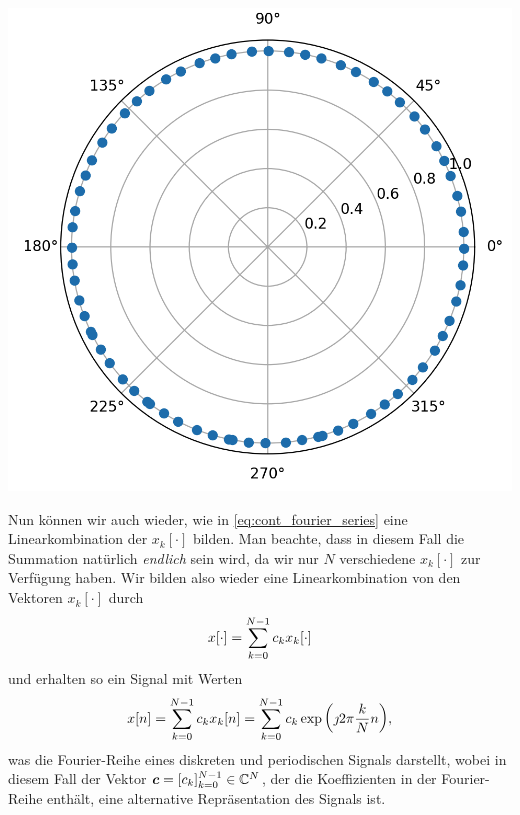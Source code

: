 \begin{listing}
\begin{minipage}{0.3\textwidth}
        \includegraphics[width=\textwidth]{code/disc_harms_comp_e.png}
    \end{minipage}
    \label{py:disc_harms_comp}
\end{listing}

Nun können wir auch wieder, wie in \eqref{eq:cont_fourier_series} eine Linearkombination der $x_k[\cdot]$ bilden.
Man beachte, dass in diesem Fall die Summation natürlich \emph{endlich} sein wird, da wir nur $N$ verschiedene $x_k[\cdot]$ zur Verfügung haben.
Wir bilden also wieder eine Linearkombination von den Vektoren $x_k[\cdot]$ durch
\[
    x[\cdot] = {\sum\limits_{k = 0}^{N-1}{c_k x_k[\cdot]}}
\]
und erhalten so ein Signal mit Werten
\begin{equation}\label{eq:disc_fourier_series}
    x[n] 
        = {\sum\limits_{k = 0}^{N-1}{c_k x_k[n]}} 
        = {\sum\limits_{k = 0}^{N-1}{
            c_k \exp\left(
                \jmath 2 \pi \frac{k}{N} n
            \right) 
        }},
\end{equation}
was die Fourier-Reihe eines diskreten und periodischen Signals darstellt, wobei in diesem Fall der Vektor $\bm c = [c_k]_{k=0}^{N-1} \in \mathbb{C}^N$, der die Koeffizienten in der Fourier-Reihe enthält, eine alternative Repräsentation des Signals ist.

